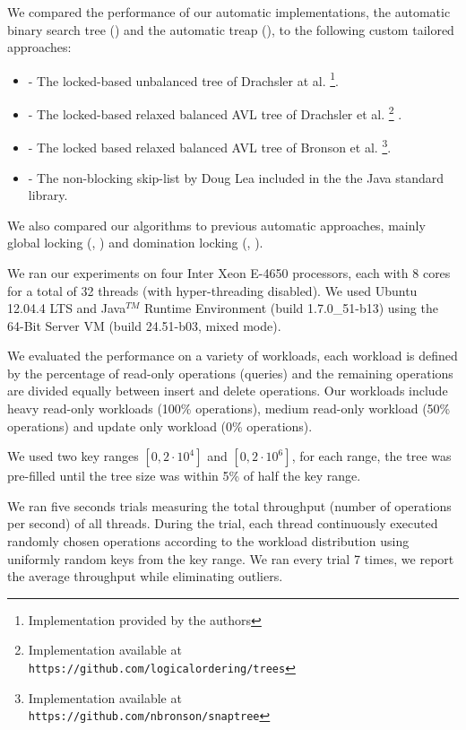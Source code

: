 We compared the performance of our automatic implementations, 
the automatic binary search tree (\autoTree) and the automatic
treap (\autoTreap), to the following custom tailored approaches: 
\begin{itemize}
\item \danaTree - The locked-based 
				unbalanced tree of Drachsler at al.\cite{DrachslerVY2014}
				\footnote{Implementation provided by the authors}. 
\item \danaAVL - The locked-based relaxed balanced AVL tree of 
				Drachsler et al.\cite{DrachslerVY2014}
				\footnote{Implementation available at \\
				\texttt{https://github.com/logicalordering/trees}} .
\item \bronson - The locked based relaxed balanced AVL tree
				of Bronson et al.\cite{BronsonCCO2010}
				\footnote{Implementation available at \\
				\texttt{https://github.com/nbronson/snaptree}}.
\item \skiplist - The non-blocking skip-list by Doug 
				Lea included in the 
				the Java standard library.
\end{itemize}

We also compared our algorithms to previous automatic approaches, 
mainly global locking (\globalTree, \globalTreap) 
and domination locking (\domTree, \domTreap). 

We ran our experiments on four Inter Xeon E-4650 processors, 
each with 8 cores for a total of 32 threads 
(with hyper-threading disabled). 
We used Ubuntu 12.04.4 LTS and Java$^{TM}$ Runtime Environment (build
1.7.0\_51-b13) using the 64-Bit Server VM (build 24.51-b03, mixed mode).


We evaluated the performance on a variety of workloads, 
each workload is defined by the percentage of read-only
operations (\getOP queries) and the remaining operations 
are divided equally between insert and delete operations.
Our workloads include heavy read-only workloads
(100\% \getOP operations), medium read-only workload 
(50\% \getOP operations) and update only workload
(0\% \getOP operations). 

We used two key ranges $[0,2\cdot10^4]$ and $[0,2\cdot10^6]$,
for each range, the tree was pre-filled until the tree size was 
within 5\% of half the key range.   

We ran five seconds trials measuring the total throughput
(number of operations per second) of all threads.
During the trial, each thread continuously executed randomly
chosen operations according to the workload distribution 
using uniformly random keys from the key range.  
We ran every trial 7 times, we report the average throughput
while eliminating outliers.

